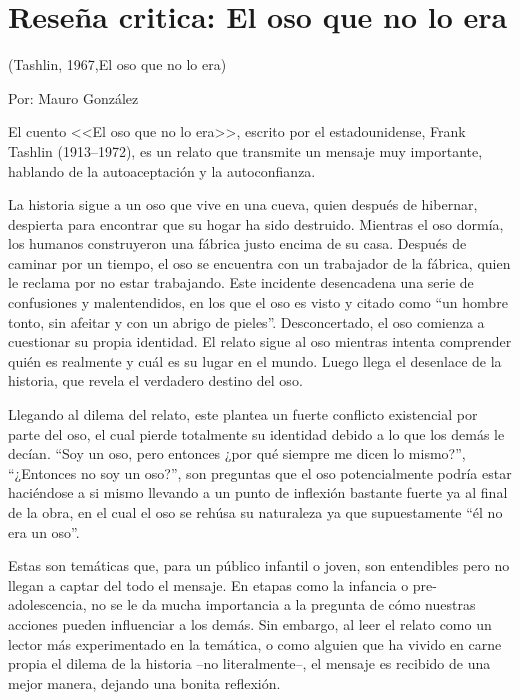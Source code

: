\documentclass[letterpaper, 12pt]{report}
\begin{document}

\chapter*{Reseña critica: El oso que no lo era}


 (Tashlin, 1967,El oso que no lo era)

\nocite{FrankTashlin}

\noindent\makebox[\linewidth]{\rule{\textwidth}{0.4pt}}

Por: Mauro González

\noindent\makebox[\linewidth]{\rule{\textwidth}{0.4pt}}

\vspace{1cm}

El cuento <<El oso que no lo era>>, escrito por el estadounidense,
Frank Tashlin (1913--1972), es un relato que transmite un mensaje muy
importante, hablando de la autoaceptación y la autoconfianza.

La historia sigue a un oso que vive en una cueva, quien después de hibernar,
despierta para encontrar que su hogar ha sido destruido. Mientras el oso dormía,
los humanos construyeron una fábrica justo encima de su casa. Después de
caminar por un tiempo, el oso se encuentra con un trabajador de la fábrica,
quien le reclama por no estar trabajando. Este incidente desencadena una
serie de confusiones y malentendidos, en los que el oso es visto y citado
como ``un hombre tonto, sin afeitar y con un abrigo de pieles''. Desconcertado,
el oso comienza a cuestionar su propia identidad. El relato sigue al oso
mientras intenta comprender quién es realmente y cuál es su lugar en el mundo.
Luego llega el desenlace de la historia, que revela el verdadero destino del oso.

Llegando al dilema del relato, este plantea un fuerte conflicto existencial
por parte del oso, el cual pierde totalmente su identidad debido a lo que los
demás le decían. ``Soy un oso, pero entonces ¿por qué siempre me dicen lo mismo?'',
``¿Entonces no soy un oso?'', son preguntas que el oso potencialmente podría
estar haciéndose a si mismo llevando a un punto de inflexión bastante fuerte
ya al final de la obra, en el cual el oso se rehúsa su naturaleza ya que
supuestamente ``él no era un oso''.

Estas son temáticas que, para un público infantil o joven, son entendibles pero
no llegan a captar del todo el mensaje. En etapas como la infancia o
pre-adolescencia, no se le da mucha importancia a la pregunta de cómo
nuestras acciones pueden influenciar a los demás. Sin embargo, al leer el
relato como un lector más experimentado en la temática, o como alguien que
ha vivido en carne propia el dilema de la historia --no literalmente--, el
mensaje es recibido de una mejor manera, dejando una bonita reflexión.
\end{document}
